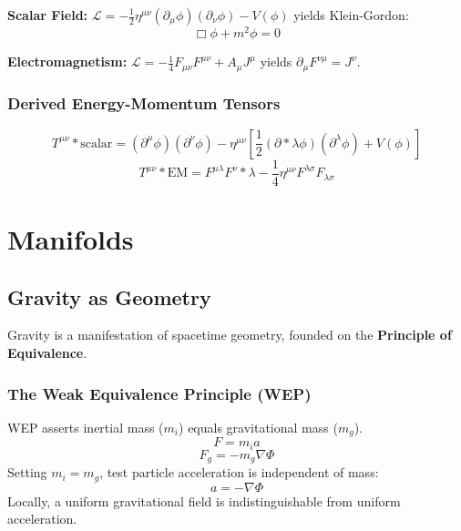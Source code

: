 \documentclass[11pt, a4paper]{report}
\begin{document}
\textbf{Scalar Field:} $\mathcal{L} = -\frac{1}{2}\eta^{\mu\nu}(\partial_\mu\phi)(\partial_\nu\phi) - V(\phi)$ yields Klein-Gordon:
\begin{equation}
\Box\phi + m^2\phi = 0
\end{equation}

\textbf{Electromagnetism:} $\mathcal{L} = -\frac{1}{4}F_{\mu\nu}F^{\mu\nu} + A_\mu J^\mu$ yields $\partial_\mu F^{\nu\mu} = J^\nu$.

\subsection*{Derived Energy-Momentum Tensors}
\begin{equation}
T^{\mu\nu}*{\text{scalar}} = (\partial^\mu\phi)(\partial^\nu\phi) - \eta^{\mu\nu}\left[\frac{1}{2}(\partial*\lambda\phi)(\partial^\lambda\phi) + V(\phi)\right]
\end{equation}
\begin{equation}
T^{\mu\nu}*{\text{EM}} = {F^{\mu\lambda}}{F^\nu}*\lambda - \frac{1}{4}\eta^{\mu\nu} F^{\lambda\sigma}F_{\lambda\sigma}
\end{equation}


\chapter{Manifolds}

\section{Gravity as Geometry}
Gravity is a manifestation of spacetime geometry, founded on the \textbf{Principle of Equivalence}.

\subsection*{The Weak Equivalence Principle (WEP)}
WEP asserts inertial mass ($m_i$) equals gravitational mass ($m_g$).
\begin{equation} F = m_i a \end{equation}
\begin{equation} F_g = -m_g \nabla \Phi \end{equation}
Setting $m_i = m_g$, test particle acceleration is independent of mass:
\begin{equation} a = -\nabla \Phi \end{equation}
Locally, a uniform gravitational field is indistinguishable from uniform acceleration.
\end{document}
